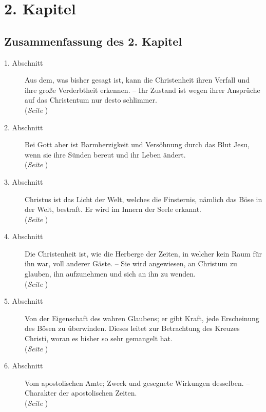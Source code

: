 
\chapter{2. Kapitel}  \label{kap2}


\section{Zusammenfassung des 2. Kapitel}
\footnotesize
\begin{description}
\item[1. Abschnitt] Aus dem, was bisher gesagt ist, kann die Christenheit ihren
Verfall und ihre große Verderbtheit erkennen. -- Ihr Zustand ist wegen ihrer
Ansprüche auf das Christentum
 nur desto schlimmer.
\\ (\textit{Seite \pageref{kap2_ab1}})
\item[2. Abschnitt] Bei Gott aber ist Barmherzigkeit und Versöhnung durch das
Blut Jesu, wenn sie ihre Sünden bereut und ihr Leben ändert.
\\(\textit{Seite \pageref{kap2_ab2}})
\item[3. Abschnitt] Christus ist das Licht der Welt, welches die Finsternis,
nämlich das Böse in der Welt, bestraft. Er wird im Innern der Seele erkannt.
\\(\textit{Seite \pageref{kap2_ab3}})
\item[4. Abschnitt] Die Christenheit ist, wie die Herberge der Zeiten, in
welcher kein Raum für ihn war, voll anderer Gäste. -- Sie wird angewiesen, an
Christum zu glauben, ihn aufzunehmen und sich an ihn zu wenden.
\\(\textit{Seite \pageref{kap2_ab4}})
\item[5. Abschnitt] Von der Eigenschaft des wahren Glaubens; er gibt Kraft,
jede Erscheinung des Bösen zu überwinden. Dieses leitet%
 zur Betrachtung des
Kreuzes Christi, woran es bisher so sehr gemangelt hat.
\\(\textit{Seite \pageref{kap2_ab5}})
\item[6. Abschnitt] Vom apostolischen Amte; Zweck und gesegnete Wirkungen
desselben. -- Charakter der apostolischen Zeiten.
\\(\textit{Seite \pageref{kap2_ab6}})

\end{description}
